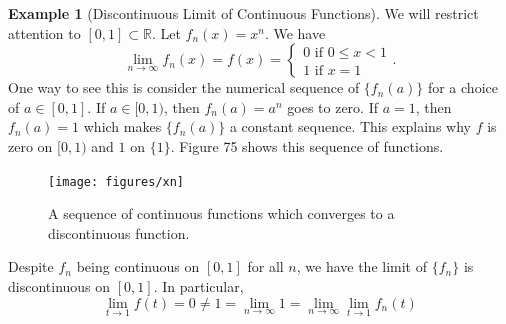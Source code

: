\documentclass{article}
\newcommand{\R}{\mathbb{R}}
\theoremstyle{definition}
\newtheorem{example}{Example}[section]
\begin{document}
	\begin{example}[Discontinuous Limit of Continuous Functions]
		We will restrict attention to $ [0,1]\subset\R $. Let $ f_n(x)=x^n $. We have $$ \lim\limits_{n\to\infty}f_n(x)=f(x)=\begin{cases}
			0\text{ if } 0\le x<1\\1\text{ if } x=1
		\end{cases} .$$ One way to see this is consider the numerical sequence of $ \{f_n(a)\} $ for a choice of $ a\in[0,1] $. If $ a\in[0,1) $, then $ f_n(a)=a^n $ goes to zero. If $ a=1 $, then $ f_n(a)=1  $ which makes $ \{f_n(a)\}  $ a constant sequence. This explains why $ f $ is zero on $ [0,1) $ and $ 1 $ on $ \{1\} $. Figure 75 shows this sequence of functions. 
		\begin{figure}[h!]
			\centering
			\texttt{[image: figures/xn]}
			\caption{A sequence of continuous functions which converges to a discontinuous function.}
		\end{figure}
		Despite $ f_n $ being continuous on $ [0,1] $ for all $ n $, we have the limit of $ \{f_n\} $ is discontinuous on $ [0,1] $. In particular, $$\lim\limits_{t\to 1}f(t)=0\neq 1=\lim\limits_{n\to \infty}1=\lim\limits_{n\to \infty}\lim\limits_{t\to 1}f_n(t) $$
	\end{example} 
\end{document}
